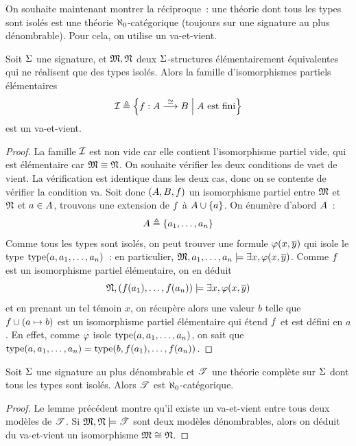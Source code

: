 On souhaite maintenant montrer la réciproque~: une théorie dont tous les types
sont isolés est une théorie $\aleph_0$-catégorique (toujours sur une signature
au plus dénombrable). Pour cela, on utilise un va-et-vient.

\begin{lemma}\label{lem.isolation.bandf}
  Soit $\Sigma$ une signature, et $\mathfrak{M},\mathfrak{N}$ deux $\Sigma$-structures
  élémentairement équivalentes qui ne réalisent que des types isolés. Alors
  la famille d'isomorphismes partiels élémentaires
  \[\mathcal{I}\triangleq
  \left\{ f : \displaystyle A \overset{\cong}{\longrightarrow} B \;\middle\vert\; A\text{ est fini} \right\}\]
  est un va-et-vient.
\end{lemma}

\begin{proof}
  La famille $\mathcal{I}$ est non vide car elle contient l'isomorphisme partiel
  vide, qui est élémentaire car $\mathfrak{M}\equiv\mathfrak{N}$. On souhaite vérifier les
  deux conditions de \og va\fg et de \og vient\fg. La vérification est identique
  dans les deux cas, donc on se contente de vérifier la condition \og va\fg.
  Soit donc $(A,B,f)$ un isomorphisme partiel entre $\mathfrak{M}$ et
  $\mathfrak{N}$ et $a \in A$, trouvons une extension de $f$ à
  $A\cup\{a\}$. On énumère d'abord $A$~:
  \[A \triangleq \{a_1,\ldots,a_n\}\]
  Comme tous les types sont isolés, on peut trouver une formule
  $\varphi(x,\overline{y})$ qui isole le type $\operatorname{type}(a,a_1,\ldots,a_n)$~: en
  particulier, $\mathfrak{M},a_1,\ldots,a_n\models\exists x, \varphi(x,\overline{y})$. Comme
  $f$ est un isomorphisme partiel élémentaire, on en déduit
  \[\mathfrak{N},(f(a_1),\ldots,f(a_n))\models
  \exists x,\varphi(x,\overline{y})\]
  et en prenant un tel témoin $x$, on récupère alors une valeur $b$ telle que
  $f\cup(a\mapsto b)$ est un isomorphisme partiel élémentaire qui étend
  $f$ et est défini en $a$. En effet, comme $\varphi$ isole
  $\operatorname{type}(a,a_1,\ldots,a_n)$, on sait que
  $\operatorname{type}(a,a_1,\ldots,a_n) = \operatorname{type}(b,f(a_1),\ldots,f(a_n))$.
\end{proof}

\begin{corollary}
  Soit $\Sigma$ une signature au plus dénombrable et $\mathscr T$ une théorie complète
  sur $\Sigma$ dont tous les types sont isolés. Alors $\mathscr T$ est
  $\aleph_0$-catégorique.
\end{corollary}

\begin{proof}
  Le lemme précédent montre qu'il existe un va-et-vient entre tous deux modèles
  de $\mathscr T$. Si $\mathfrak{M},\mathfrak{N}\models\mathscr T$ sont deux modèles dénombrables,
  alors on déduit du va-et-vient un isomorphisme $\mathfrak{M}\cong\mathfrak{N}$.
\end{proof}

